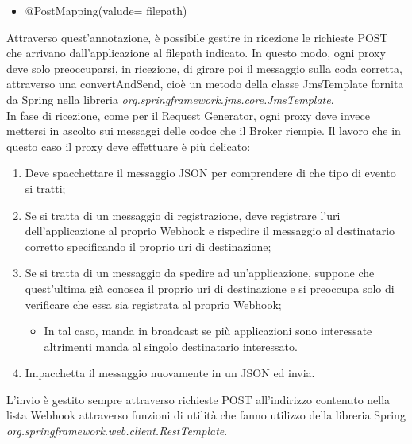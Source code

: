 \begin{itemize}
	\item @PostMapping(valude= {filepath})
\end{itemize}

Attraverso quest'annotazione, è possibile gestire in ricezione le richieste POST che arrivano dall'applicazione al filepath indicato. In questo modo, ogni proxy deve solo preoccuparsi, in ricezione, di girare poi il messaggio sulla coda corretta, attraverso una convertAndSend, cioè un metodo della classe JmsTemplate fornita da Spring nella libreria \textit{org.springframework.jms.core.JmsTemplate}. \vspace{0.5cm}
\\In fase di ricezione, come per il Request Generator, ogni proxy deve invece mettersi in ascolto sui messaggi delle codce che il Broker riempie. Il lavoro che in questo caso il proxy deve effettuare è più delicato: 

\begin{enumerate}
      \item Deve spacchettare il messaggio JSON per comprendere di che tipo di evento si tratti;
            
      \item Se si tratta di un messaggio di registrazione, deve registrare l'uri dell'applicazione al proprio Webhook e rispedire il messaggio al destinatario corretto specificando il proprio uri di destinazione;
      
      \item Se si tratta di un messaggio da spedire ad un'applicazione, suppone che quest'ultima già conosca il proprio uri di destinazione e si preoccupa solo di verificare che essa sia registrata al proprio Webhook;
      \begin{itemize}
        \item In tal caso, manda in broadcast se più applicazioni sono interessate altrimenti manda al singolo destinatario interessato. 
      \end{itemize}
      
      \item Impacchetta il messaggio nuovamente in un JSON ed invia. 
\end{enumerate}

L'invio è gestito sempre attraverso richieste POST all'indirizzo contenuto nella lista Webhook attraverso funzioni di utilità che fanno utilizzo della libreria Spring \textit{org.springframework.web.client.RestTemplate}. 
